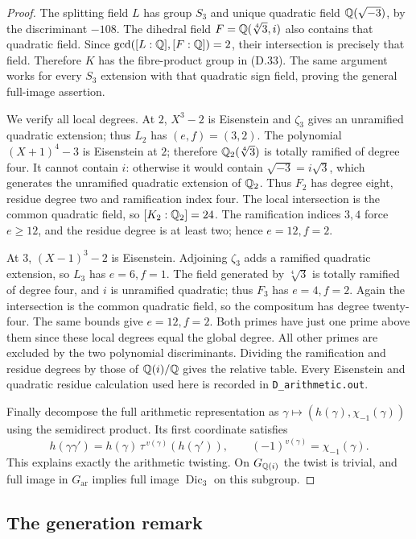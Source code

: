 \begin{proof}
The splitting field \(L\) has group \(S_3\) and unique
quadratic field \(\mathbb Q(\sqrt{-3})\), by the discriminant
\(-108\).  The dihedral field \(F=\mathbb Q(\sqrt[4]{3},i)\)
also contains that quadratic field.  Since
\(\gcd([L:\mathbb Q],[F:\mathbb Q])=2\), their intersection is precisely
that field.  Therefore \(K\) has the fibre-product group
in (D.33).  The same argument works for every \(S_3\)
extension with that quadratic sign field, proving the
general full-image assertion.

We verify all local degrees.  At \(2\), \(X^3-2\) is
Eisenstein and \(\zeta_3\) gives an unramified quadratic
extension; thus \(L_2\) has \((e,f)=(3,2)\).
The polynomial \((X+1)^4-3\) is Eisenstein at \(2\);
therefore \(\mathbb Q_2(\sqrt[4]{3})\) is totally ramified of
degree four.  It cannot contain \(i\): otherwise it would
contain \(\sqrt{-3}=i\sqrt3\), which generates the
unramified quadratic extension of \(\mathbb Q_2\).
Thus \(F_2\) has degree eight, residue degree two and
ramification index four.  The local intersection is the
common quadratic field, so \([K_2:\mathbb Q_2]=24\).
The ramification indices \(3,4\) force \(e\ge12\), and
the residue degree is at least two; hence \(e=12,f=2\).

At \(3\), \((X-1)^3-2\) is Eisenstein.
Adjoining \(\zeta_3\) adds a ramified quadratic extension,
so \(L_3\) has \(e=6,f=1\).
The field generated by \(\sqrt[4]{3}\) is totally ramified
of degree four, and \(i\) is unramified quadratic; thus
\(F_3\) has \(e=4,f=2\).
Again the intersection is the common quadratic field, so
the compositum has degree twenty-four.  The same bounds
give \(e=12,f=2\).
Both primes have just one prime above them since these
local degrees equal the global degree.
All other primes are excluded by the two polynomial
discriminants.  Dividing the ramification and residue
degrees by those of \(\mathbb Q(i)/\mathbb Q\) gives the relative table.
Every Eisenstein and quadratic residue calculation used
here is recorded in \texttt{D\_arithmetic.out}.

Finally decompose the full arithmetic representation as
\(\gamma\mapsto(h(\gamma),\chi_{-1}(\gamma))\) using the
semidirect product.  Its first coordinate satisfies
\[
 h(\gamma\gamma')=
 h(\gamma)\,\tau^{\,v(\gamma)}(h(\gamma')),
 \qquad (-1)^{v(\gamma)}=\chi_{-1}(\gamma).
 \tag{D.35}
\]
This explains exactly the arithmetic twisting.  On
\(G_{\mathbb Q(i)}\) the twist is trivial, and full image in
\(G_{\mathrm{ar}}\) implies full image
\(\operatorname{Dic}_3\) on this subgroup.
\end{proof}

\subsection{The generation remark}


